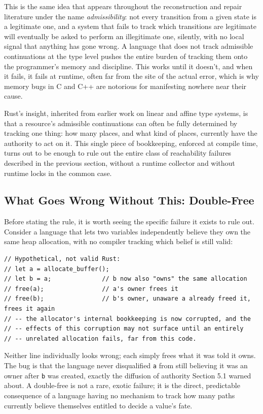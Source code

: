 \documentclass[11pt]{book}
\begin{document}
This is the same idea that appears throughout the reconstruction and repair literature under the name \emph{admissibility}: not every transition from a given state is a legitimate one, and a system that fails to track which transitions are legitimate will eventually be asked to perform an illegitimate one, silently, with no local signal that anything has gone wrong. A language that does not track admissible continuations at the type level pushes the entire burden of tracking them onto the programmer's memory and discipline. This works until it doesn't, and when it fails, it fails at runtime, often far from the site of the actual error, which is why memory bugs in C and C++ are notorious for manifesting nowhere near their cause.

Rust's insight, inherited from earlier work on linear and affine type systems, is that a resource's admissible continuations can often be fully determined by tracking one thing: how many places, and what kind of places, currently have the authority to act on it. This single piece of bookkeeping, enforced at compile time, turns out to be enough to rule out the entire class of reachability failures described in the previous section, without a runtime collector and without runtime locks in the common case.

\subsection*{What Goes Wrong Without This: Double-Free}

Before stating the rule, it is worth seeing the specific failure it exists to rule out. Consider a language that lets two variables independently believe they own the same heap allocation, with no compiler tracking which belief is still valid:

\begin{lstlisting}
// Hypothetical, not valid Rust:
// let a = allocate_buffer();
// let b = a;              // b now also "owns" the same allocation
// free(a);                // a's owner frees it
// free(b);                // b's owner, unaware a already freed it, frees it again
// -- the allocator's internal bookkeeping is now corrupted, and the
// -- effects of this corruption may not surface until an entirely
// -- unrelated allocation fails, far from this code.
\end{lstlisting}

Neither line individually looks wrong; each simply frees what it was told it owns. The bug is that the language never disqualified \texttt{a} from still believing it was an owner after \texttt{b} was created, exactly the diffusion of authority Section 5.1 warned about. A double-free is not a rare, exotic failure; it is the direct, predictable consequence of a language having no mechanism to track how many paths currently believe themselves entitled to decide a value's fate.
\end{document}
